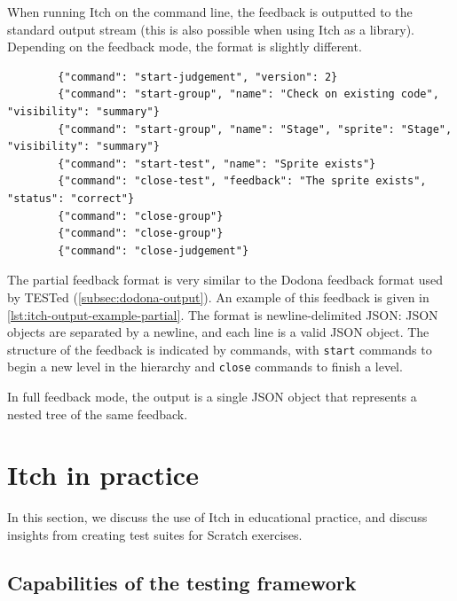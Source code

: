 \documentclass[../main]{subfiles}
\begin{document}
When running Itch on the command line, the feedback is outputted to the standard output stream (this is also possible when using Itch as a library).
Depending on the feedback mode, the format is slightly different.

\begin{listing}
    \begin{verbatim}
        {"command": "start-judgement", "version": 2}
        {"command": "start-group", "name": "Check on existing code", "visibility": "summary"}
        {"command": "start-group", "name": "Stage", "sprite": "Stage", "visibility": "summary"}
        {"command": "start-test", "name": "Sprite exists"}
        {"command": "close-test", "feedback": "The sprite exists", "status": "correct"}
        {"command": "close-group"}
        {"command": "close-group"}
        {"command": "close-judgement"}
    \end{verbatim}
    \caption{Example of the output generated by Itch for a test suite with two nested groups, with one test. Note the similarity to \cref{lst:tested-output-example}.}\label{lst:itch-output-example-partial}
\end{listing}

The partial feedback format is very similar to the Dodona feedback format used by TESTed (\cref{subsec:dodona-output}).
An example of this feedback is given in \cref{lst:itch-output-example-partial}.
The format is newline-delimited JSON: JSON objects are separated by a newline, and each line is a valid JSON object.
The structure of the feedback is indicated by commands, with \texttt{start} commands to begin a new level in the hierarchy and \texttt{close} commands to finish a level.

In full feedback mode, the output is a single JSON object that represents a nested tree of the same feedback.

\section{Itch in practice}\label{sec:itch-evaluation}

In this section, we discuss the use of Itch in educational practice, and discuss insights from creating test suites for Scratch exercises.

\subsection{Capabilities of the testing framework}\label{subsec:capabilities-of-the-testing-framework}
\end{document}
